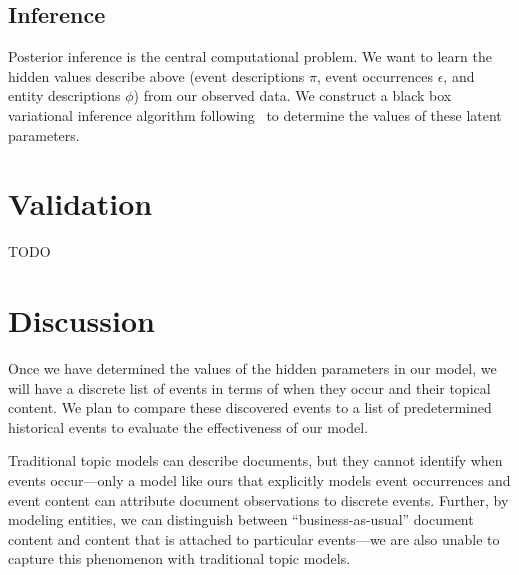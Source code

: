 \subsection{Inference}
Posterior inference is the central computational problem.  We want to learn the hidden values describe above (event descriptions $\pi$, event occurrences $\epsilon$, and entity descriptions $\phi$) from our observed data.  We construct a black box variational inference algorithm following~\citet{Ranganath:2014} to determine the values of these latent parameters.

\section{Validation}
TODO

\section{Discussion}
Once we have determined the values of the hidden parameters in our model, we will have a discrete list of events in terms of when they occur and their topical content.  We plan to compare these discovered events to a list of predetermined historical events to evaluate the effectiveness of our model.

Traditional topic models can describe documents, but they cannot identify when events occur---only a model like ours that explicitly models event occurrences and event content can attribute document observations to discrete events.  Further, by modeling entities, we can distinguish between ``business-as-usual'' document content and content that is attached to particular events---we are also unable to capture this phenomenon with traditional topic models.








